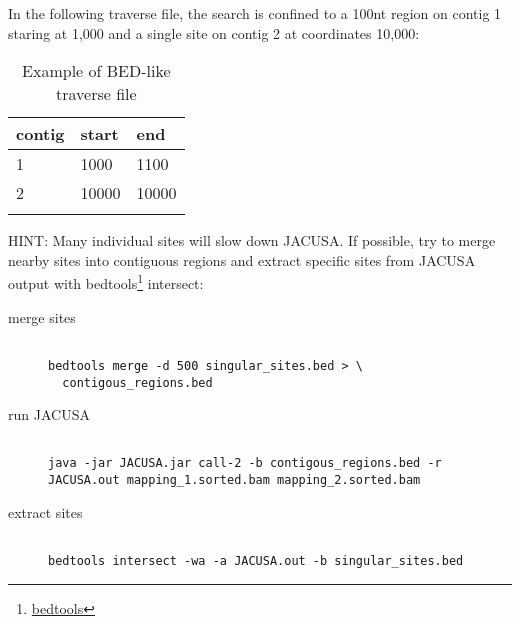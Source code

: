 \documentclass[10pt, a4paper]{article}
\begin{document}
In the following traverse file, the search is confined to a 100nt region on contig 1
staring at 1,000 and a single site on contig 2 at coordinates 10,000:
\begin{table}
\centering
\caption{Example of BED-like traverse file}
\label{tb:traverse_file}
\begin{tabular}{lll}
\textbf{contig} & \textbf{start} & \textbf{end} \\
\hline
1 & 1000 & 1100 \\
2 & 10000 & 10000 \\
\multicolumn{3}{c}{}
\end{tabular}
\end{table}
HINT: Many individual sites will slow down JACUSA. If possible, try to merge nearby sites into
contiguous regions and extract specific sites from JACUSA output with
bedtools\footnote{\href{http://bedtools.readthedocs.org/en/latest/}{bedtools}} intersect:
\begin{description}
\item[merge sites] \begin{verbatim} 

bedtools merge -d 500 singular_sites.bed > \ 
  contigous_regions.bed
\end{verbatim}
\item[run JACUSA] \begin{verbatim} 

java -jar JACUSA.jar call-2 -b contigous_regions.bed -r
JACUSA.out mapping_1.sorted.bam mapping_2.sorted.bam
\end{verbatim}
\item[extract sites] \begin{verbatim}

bedtools intersect -wa -a JACUSA.out -b singular_sites.bed
\end{verbatim}
\end{description}
\end{document}
